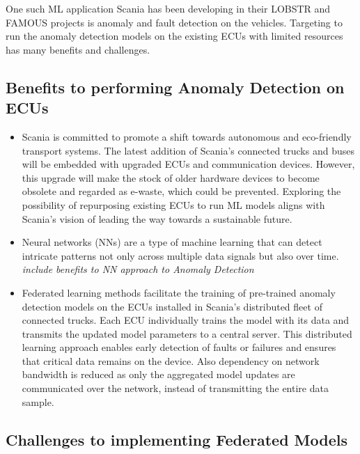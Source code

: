 One such ML application Scania has been developing in their \textsc{LOBSTR} \cite{lobstr} and \textsc{FAMOUS} \cite{famous} projects is anomaly and fault detection on the vehicles. Targeting to run the anomaly detection models on the existing ECUs with limited resources has many benefits and challenges.

\subsection*{Benefits to performing Anomaly Detection on ECUs}

\begin{itemize}
	\item Scania is committed to promote a shift towards autonomous and eco-friendly transport systems. The latest addition of Scania's connected trucks and buses will be embedded with upgraded ECUs and communication devices. However, this upgrade will make the stock of older hardware devices to become obsolete and regarded as e-waste, which could be prevented. Exploring the possibility of repurposing existing ECUs to run ML models aligns with Scania's vision of leading the way towards a sustainable future.
	\item Neural networks (NNs) are a type of machine learning that can detect intricate patterns not only across multiple data signals but also over time. \textit{include benefits to NN approach to Anomaly Detection}
	\item Federated learning methods facilitate the training of pre-trained anomaly detection models on the ECUs installed in Scania's distributed fleet of connected trucks. Each ECU individually trains the model with its data and transmits the updated model parameters to a central server. This distributed learning approach enables early detection of faults or failures and ensures that critical data remains on the device. Also dependency on network bandwidth is reduced as only the aggregated model updates are communicated over the network, instead of transmitting the entire data sample.
\end{itemize}

\subsection*{Challenges to implementing Federated Models}

